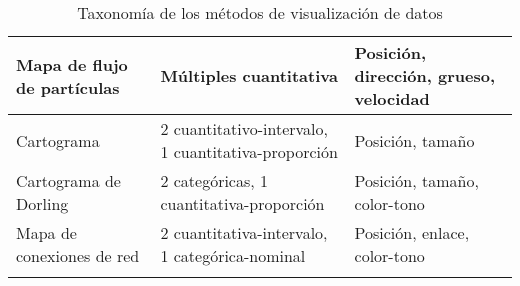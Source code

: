 \begin{longtable}{ | P{5cm} | P{5cm} | P{5cm} |}
  \hline
  Mapa de flujo de partículas & Múltiples cuantitativa                                        & Posición, dirección, grueso, velocidad \\
  \hline
  Cartograma                 & 2 cuantitativo-intervalo, 1 cuantitativa-proporción            & Posición, tamaño \\
  \hline
  Cartograma de Dorling      & 2 categóricas, 1 cuantitativa-proporción                       & Posición, tamaño, color-tono \\
  \hline
  Mapa de conexiones de red  & 2 cuantitativa-intervalo, 1 categórica-nominal                 & Posición, enlace, color-tono \\
  \hline
  \caption[Taxonomía de los métodos de visualización de datos]{Taxonomía de los métodos de visualización de datos}
  \label{table:appa}
 \end{longtable}
